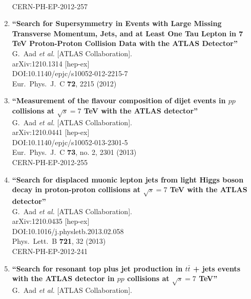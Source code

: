 \documentclass{article}
\begin{document}
\begin{enumerate}
  \\{}CERN-PH-EP-2012-257
\item%
{\bf ``Search for Supersymmetry in Events with Large Missing Transverse Momentum, Jets, and at Least One Tau Lepton in 7 TeV Proton-Proton Collision Data with the ATLAS Detector''}
  \\{}G.~Aad {\it et al.} [ATLAS Collaboration].
  \\{}arXiv:1210.1314 [hep-ex]
  \\{}DOI:10.1140/epjc/s10052-012-2215-7
  \\{}Eur.\ Phys.\ J.\ C {\bf 72}, 2215 (2012)
\item%
{\bf ``Measurement of the flavour composition of dijet events in $pp$ collisions at $\sqrt{s}=7$ TeV with the ATLAS detector''}
  \\{}G.~Aad {\it et al.} [ATLAS Collaboration].
  \\{}arXiv:1210.0441 [hep-ex]
  \\{}DOI:10.1140/epjc/s10052-013-2301-5
  \\{}Eur.\ Phys.\ J.\ C {\bf 73}, no. 2, 2301 (2013)
  \\{}CERN-PH-EP-2012-255
\item%
{\bf ``Search for displaced muonic lepton jets from light Higgs boson decay in proton-proton collisions at $\sqrt{s}=7$ TeV with the ATLAS detector''}
  \\{}G.~Aad {\it et al.} [ATLAS Collaboration].
  \\{}arXiv:1210.0435 [hep-ex]
  \\{}DOI:10.1016/j.physletb.2013.02.058
  \\{}Phys.\ Lett.\ B {\bf 721}, 32 (2013)
  \\{}CERN-PH-EP-2012-241
\item%
{\bf ``Search for resonant top plus jet production in $t\bar{t}$ + jets events with the ATLAS detector in $pp$ collisions at $\sqrt{s}=7$ TeV''}
  \\{}G.~Aad {\it et al.} [ATLAS Collaboration].

\end{enumerate}
\end{document}
